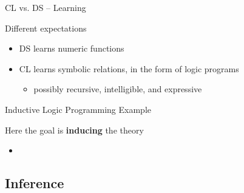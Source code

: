 \documentclass[presentation]{beamer}\mode<presentation>{\usetheme{AMSBolognaFC}}
\begin{document}
\begin{frame}[allowframebreaks]{CL vs. DS -- Learning}
    \begin{block}{Different expectations}
        \begin{itemize}
            \item DS learns numeric \alert{functions}
            \item CL learns symbolic \alert{relations}, in the form of \alert{logic programs}
            \begin{itemize}
                \item possibly \alert{recursive}, \alert{intelligible}, and expressive
            \end{itemize}
        \end{itemize}
    \end{block}
\end{frame}

\begin{frame}{Inductive Logic Programming Example}
    \begin{exampleblock}{Here the goal is \textbf{inducing} the theory}
        \begin{itemize}
            \item {}
        \end{itemize}
    \end{exampleblock}
\end{frame}

\subsection{Inference}
\end{document}
